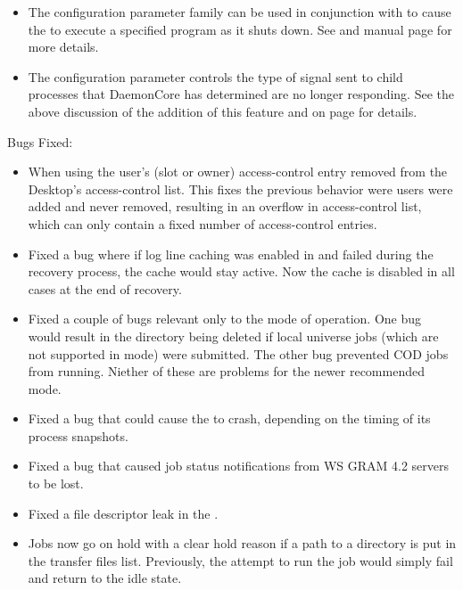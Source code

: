 \begin{itemize}
\item The configuration parameter family
   can be used in conjunction
  with  to cause the  to execute
  a specified program as it shuts down.  See
  \pageref{param:MasterShutdownProgram} and 
  manual page for more details.

\item The configuration parameter
   controls the type of signal
  sent to child processes that DaemonCore has determined are no longer
  responding.  See the above discussion of the addition of this
  feature and  on page
  \pageref{param:NotRespondingWantCore} for details.


\end{itemize}

\noindent Bugs Fixed:

\begin{itemize}

\item When using  the user's (slot or owner)
access-control entry removed from the Desktop's access-control list.  This
fixes the previous behavior were users were added and never removed, 
resulting in an overflow in access-control list, which can only contain 
a fixed number of access-control entries.

\item Fixed a bug where if log line caching was enabled in 
and  failed during the recovery process, the cache would
stay active. Now the cache is disabled in all cases at the end of recovery.

\item Fixed a couple of bugs relevant only to the 
mode of operation. One bug would result in the  directory being
deleted if local universe jobs (which are not supported in
 mode) were submitted. The other bug prevented
COD jobs from running. Niether of these are problems for the newer
recommended  mode.

\item Fixed a bug that could cause the  to crash, depending
on the timing of its process snapshots.

\item Fixed a bug that caused job status notifications from WS GRAM 4.2
servers to be lost.

\item Fixed a file descriptor leak in the .

\item Jobs now go on hold with a clear hold reason if a path to a
directory is put in the transfer files list.  Previously, the attempt
to run the job would simply fail and return to the idle state.

\end{itemize}

